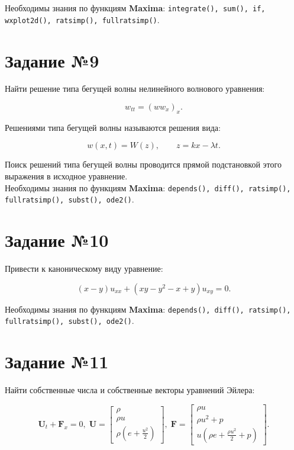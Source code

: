     Необходимы знания по функциям \textbf{Maxima}: {\tt integrate(), sum(), if, wxplot2d(), ratsimp(), fullratsimp()}.

\section*{Задание №9}

    Найти решение типа бегущей волны нелинейного волнового уравнения: 

    \[
        w_{tt} =  \left( w w_{x} \right)_{x}.
    \]

    Решениями типа бегущей волны называются решения вида:

    \[
        w(x, t) = W(z), \qquad z = k x - \lambda t.
    \]

    Поиск решений типа бегущей волны проводится прямой подстановкой этого выражения в исходное уравнение.\\

    Необходимы знания по функциям \textbf{Maxima}: {\tt depends(), diff(), ratsimp(), fullratsimp(), subst(), ode2()}.

\section*{Задание №10}

	Привести к каноническому виду уравнение:

	\[
		\left( x - y \right) u_{xx} + \left( x y - y^{2} - x + y \right) u_{xy} = 0.
	\]

	Необходимы знания по функциям \textbf{Maxima}: {\tt depends(), diff(), ratsimp(), fullratsimp(), subst(), ode2()}.

\section*{Задание №11}

	Найти собственные числа и собственные векторы уравнений Эйлера:

	\begin{equation}
		\mathbf{U}_{t} + \mathbf{F}_{x} = 0, \;
		\mathbf{U} =
		\begin{bmatrix}
			\rho \\
			\rho u \\
			\rho \left( e + \frac{u^{2}}{2} \right)
		\end{bmatrix}, \;
		\mathbf{F} =
		\begin{bmatrix}
			\rho u \\
			\rho u^{2} + p \\
			u \left( \rho e + \frac{\rho u^{2}}{2} + p \right)
		\end{bmatrix}.
	\end{equation}

